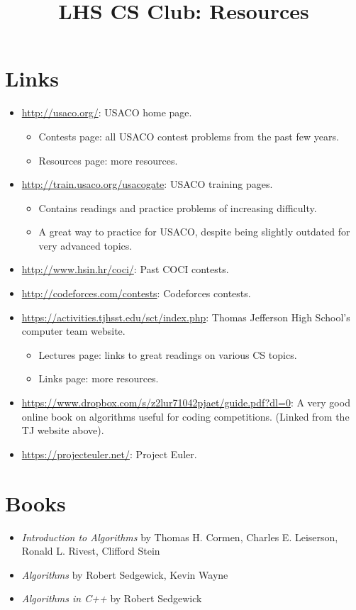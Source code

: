 \documentclass[11pt, oneside]{article}   	%
\title{LHS CS Club: Resources}
\begin{document}
\maketitle

\section{Links}
\begin{itemize}
\item \url{http://usaco.org/}: USACO home page.
\begin{itemize}
\item Contests page: all USACO contest problems from the past few years.
\item Resources page: more resources.
\end{itemize}
\item \url{http://train.usaco.org/usacogate}: USACO training pages.
\begin{itemize}
\item Contains readings and practice problems of increasing difficulty.
\item A great way to practice for USACO, despite being slightly outdated for very advanced topics.
\end{itemize}
\item \url{http://www.hsin.hr/coci/}: Past COCI contests.
\item \url{http://codeforces.com/contests}: Codeforces contests.
\item \url{https://activities.tjhsst.edu/sct/index.php}: Thomas Jefferson High School's computer team website.
\begin{itemize}
\item Lectures page: links to great readings on various CS topics.
\item Links page: more resources.
\end{itemize}
\item \url{https://www.dropbox.com/s/z2lur71042pjaet/guide.pdf?dl=0}: A very good online book on algorithms useful for coding competitions. (Linked from the TJ website above).
\item \url{https://projecteuler.net/}: Project Euler.
\end{itemize}

\section{Books}
\begin{itemize}
\item {\it Introduction to Algorithms} by Thomas H. Cormen, Charles E. Leiserson, Ronald L. Rivest, Clifford Stein
\item {\it Algorithms} by Robert Sedgewick, Kevin Wayne
\item {\it Algorithms in C++} by Robert Sedgewick
\end{itemize}
\end{document}
